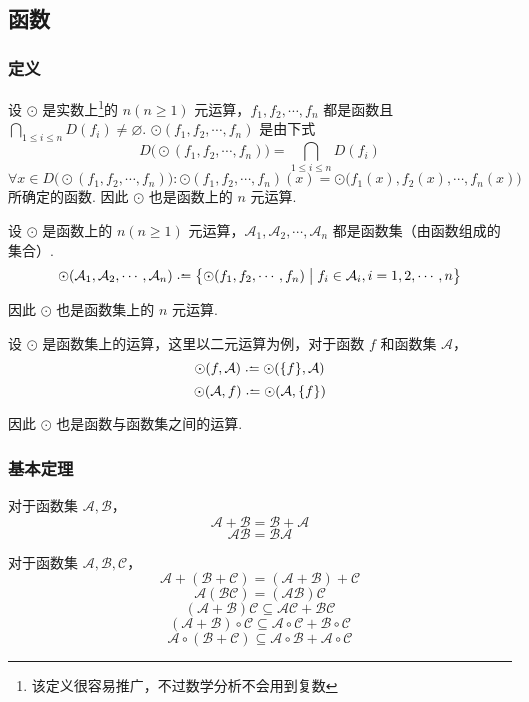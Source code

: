 \subsection{函数}
\subsubsection{定义}
\begin{definition}
    设 $\odot$ 是实数上\footnote{该定义很容易推广，不过数学分析不会用到复数}的 $n(n \geqslant 1)$ 元运算，$f_1, f_2, \cdots, f_n$ 都是函数且 $\displaystyle \bigcap_{1 \leqslant i \leqslant n}D(f_i) \neq \varnothing$. $\odot(f_1, f_2, \cdots, f_n)$ 是由下式
    \[D\bigl(\odot(f_1, f_2, \cdots, f_n)\bigr) = \bigcap_{1 \leqslant i \leqslant n}D(f_i)\]
    \[\forall x \in D\bigl(\odot(f_1, f_2, \cdots, f_n)\bigr): \odot(f_1, f_2, \cdots, f_n)(x) = \odot\bigl(f_1(x), f_2(x), \cdots, f_n(x)\bigr)\]
    所确定的函数. 因此 $\odot$ 也是函数上的 $n$ 元运算.
\end{definition}\vspace{9pt}

\begin{definition}
    设 $\odot$ 是函数上的 $n(n \geqslant 1)$ 元运算，$\mathcal{A}_1, \mathcal{A}_2, \cdots, \mathcal{A}_n$ 都是函数集（由函数组成的集合）.
    \[\odot(\mathcal{A}_1, \mathcal{A}_2, \cdots, \mathcal{A}_n) \defeq \bigl\{ \odot(f_1, f_2, \cdots, f_n) \bigm| f_i \in \mathcal{A}_i, i=1,2,\cdots,n\bigr\}\]

    因此 $\odot$ 也是函数集上的 $n$ 元运算.
\end{definition}\vspace{9pt}

\begin{definition}
    设 $\odot$ 是函数集上的运算，这里以二元运算为例，对于函数 $f$ 和函数集 $\mathcal{A}$，
    \[\odot(f,\mathcal{A}) \defeq \odot(\{f\},\mathcal{A})\]
    \[\odot(\mathcal{A},f) \defeq \odot(\mathcal{A}, \{f\})\]

    因此 $\odot$ 也是函数与函数集之间的运算.
\end{definition}

\subsubsection{基本定理}
\begin{theorem}
    对于函数集 $\mathcal{A}, \mathcal{B}$，
    \[\mathcal{A} + \mathcal{B} = \mathcal{B} + \mathcal{A}\]
    \[\mathcal{AB} = \mathcal{BA}\]
\end{theorem}\vspace{9pt}

\begin{theorem}
    对于函数集 $\mathcal{A},\mathcal{B},\mathcal{C}$，
    \[\mathcal{A} + (\mathcal{B} + \mathcal{C}) = (\mathcal{A} + \mathcal{B}) + \mathcal{C} \tag{1}\]
    \[\mathcal{A}(\mathcal{BC}) = (\mathcal{AB})\mathcal{C} \tag{2}\]
    \[(\mathcal{A} + \mathcal{B}) \mathcal{C} \subseteq \mathcal{AC} + \mathcal{BC} \tag{3}\]
    \[(\mathcal{A} + \mathcal{B}) \circ \mathcal{C} \subseteq \mathcal{A}\circ\mathcal{C} + \mathcal{B}\circ\mathcal{C} \tag{4}\]
    \[\mathcal{A}\circ(\mathcal{B} + \mathcal{C}) \subseteq \mathcal{A} \circ \mathcal{B} + \mathcal{A} \circ \mathcal{C} \tag{5}\]
\end{theorem}